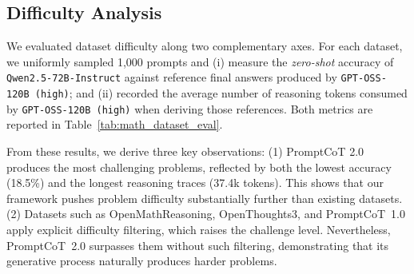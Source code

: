 \begin{table}[t]
\centering
{}
\caption{Difficulty evaluation across datasets. 
Lower accuracy of \texttt{Qwen2.5-72B-Instruct} indicates higher difficulty, while longer reasoning traces from \texttt{GPT-OSS-120B (high)} suggest that problems require deeper reasoning. 
$^\dagger$: datasets that apply explicit difficulty filtering. }
\label{tab:math_dataset_eval}
\end{table}

\subsection{Difficulty Analysis}
We evaluated dataset difficulty along two complementary axes. For each dataset, we uniformly sampled 1,000 prompts and (i) measure the \emph{zero-shot} accuracy of \texttt{Qwen2.5-72B-Instruct} against reference final answers produced by \texttt{GPT-OSS-120B (high)}; and (ii) recorded the average number of reasoning tokens consumed by \texttt{GPT-OSS-120B (high)} when deriving those references. Both metrics are reported in Table~\ref{tab:math_dataset_eval}.

From these results, we derive three key observations:
(1) PromptCoT 2.0 produces the most challenging problems, reflected by both the lowest accuracy (18.5\%) and the longest reasoning traces (37.4k tokens). 
This shows that our framework pushes problem difficulty substantially further than existing datasets. 
(2) Datasets such as OpenMathReasoning, OpenThoughts3, and PromptCoT~1.0 apply explicit difficulty filtering, which raises the challenge level. 
Nevertheless, PromptCoT~2.0 surpasses them without such filtering, demonstrating that its generative process naturally produces harder problems. 


